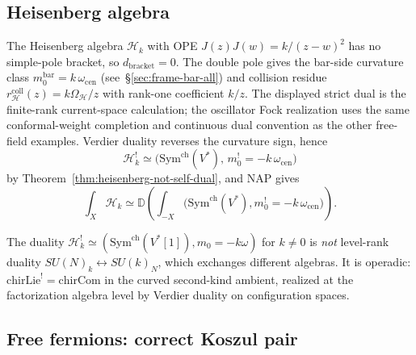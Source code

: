 \subsection{Heisenberg algebra}

\begin{example}\label{ex:heisenberg-NAP}
The Heisenberg algebra $\mathcal{H}_k$ with OPE
$J(z)J(w)=k/(z-w)^2$ has no simple-pole bracket, so
$d_{\mathrm{bracket}}=0$. The double pole gives the bar-side
curvature class $m_0^{\mathrm{bar}}=k\,\omega_{\mathrm{cen}}$
\textup{(}see~\S\ref{sec:frame-bar-all}\textup{)} and collision
residue $r^{\mathrm{coll}}_{\mathcal H}(z)=k\Omega_{\mathcal H}/z$
with rank-one coefficient $k/z$. The displayed strict dual is the
finite-rank current-space calculation; the oscillator Fock realization
uses the same conformal-weight completion and continuous dual
convention as the other free-field examples. Verdier duality reverses
the curvature sign, hence
\[
\mathcal{H}_k^!
\simeq
\bigl(\mathrm{Sym}^{\mathrm{ch}}(V^*),\,m_0^!=-k\,\omega_{\mathrm{cen}}\bigr)
\]
by Theorem~\ref{thm:heisenberg-not-self-dual}, and NAP gives
\[
\int_X \mathcal{H}_k
\simeq
\mathbb{D}\!\left(
\int_{-X}\bigl(\mathrm{Sym}^{\mathrm{ch}}(V^*),
m_0^!=-k\,\omega_{\mathrm{cen}}\bigr)\right).
\]
\end{example}

\begin{remark}\label{rem:heisenberg-koszul}
The duality
$\mathcal{H}_k^!\simeq
(\mathrm{Sym}^{\mathrm{ch}}(V^*[1]),m_0=-k\omega)$ for \(k\ne0\)
is \emph{not} level-rank duality $SU(N)_k \leftrightarrow SU(k)_N$,
which exchanges different algebras. It is operadic:
$\mathrm{chirLie}^! = \mathrm{chirCom}$ in the curved second-kind
ambient, realized at the factorization algebra level by Verdier
duality on configuration spaces.
\end{remark}

\subsection{Free fermions: correct Koszul pair}


